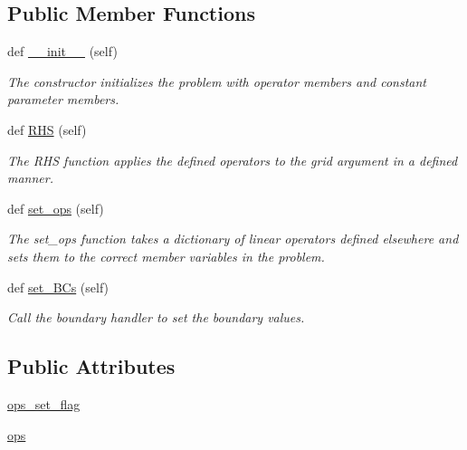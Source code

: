 \subsection*{Public Member Functions}
\begin{DoxyCompactItemize}
\item 
def \hyperlink{classMain__PDE__Repo_1_1src_1_1problem_1_1Problem_a3bd7ab602ec2348c69edcfc82fc35794}{\+\_\+\+\_\+init\+\_\+\+\_\+} (self)
\begin{DoxyCompactList}\small\item\em The constructor initializes the problem with operator members and constant parameter members. \end{DoxyCompactList}\item 
def \hyperlink{classMain__PDE__Repo_1_1src_1_1problem_1_1Problem_a1885fe3e15581db4feda8af513ae91e5}{R\+HS} (self)
\begin{DoxyCompactList}\small\item\em The R\+HS function applies the defined operators to the grid argument in a defined manner. \end{DoxyCompactList}\item 
def \hyperlink{classMain__PDE__Repo_1_1src_1_1problem_1_1Problem_aeaea1beb92b43dde42d5175ddde1f276}{set\+\_\+ops} (self)
\begin{DoxyCompactList}\small\item\em The set\+\_\+ops function takes a dictionary of linear operators defined elsewhere and sets them to the correct member variables in the problem. \end{DoxyCompactList}\item 
def \hyperlink{classMain__PDE__Repo_1_1src_1_1problem_1_1Problem_a8b13459d6f5c9709f6dc647caf6c0d5c}{set\+\_\+\+B\+Cs} (self)
\begin{DoxyCompactList}\small\item\em Call the boundary handler to set the boundary values. \end{DoxyCompactList}\end{DoxyCompactItemize}
\subsection*{Public Attributes}
\begin{DoxyCompactItemize}
\item 
\hyperlink{classMain__PDE__Repo_1_1src_1_1problem_1_1Problem_a7700a3b18e39488fbe81a8fb06ebb982}{ops\+\_\+set\+\_\+flag}
\item 
\hyperlink{classMain__PDE__Repo_1_1src_1_1problem_1_1Problem_a7736044b7f2938008a30043000e62f87}{ops}
\end{DoxyCompactItemize}


